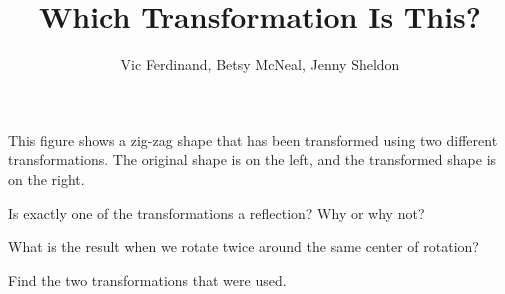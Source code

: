 \documentclass[nooutcomes]{ximera}
\title{Which Transformation Is This?}
\author{Vic Ferdinand, Betsy McNeal, Jenny Sheldon}
\begin{document}
\begin{abstract}
\end{abstract}
\maketitle



This figure shows a zig-zag shape that has been transformed using two different transformations.  The original shape is on the left, and the transformed shape is on the right.

\vskip 0.5in

\begin{center}
\end{center}
\vskip 0.5in


\begin{problem} \label{WhichTrans1}
Is exactly one of the transformations a reflection?  Why or why not?

\end{problem}

\begin{problem}
What is the result when we rotate twice around the same center of rotation? 

\end{problem}

\begin{problem}
Find the two transformations that were used.

\end{problem}
\end{document}
